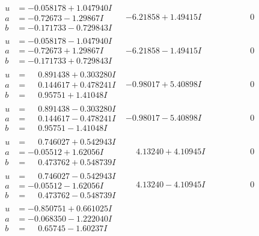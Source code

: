 \documentclass[1p]{elsarticle_modified}
\theoremstyle{definition}
\begin{document}
$$\begin{array}{c|c|c}
\begin{aligned}
u &= -0.058178 + 1.047940 I \\
a &= -0.72673 - 1.29867 I \\
b &= -0.171733 - 0.729843 I\end{aligned}
 & -6.21858 + 1.49415 I & \phantom{-0.000000 } 0 \\ \hline\begin{aligned}
u &= -0.058178 - 1.047940 I \\
a &= -0.72673 + 1.29867 I \\
b &= -0.171733 + 0.729843 I\end{aligned}
 & -6.21858 - 1.49415 I & \phantom{-0.000000 } 0 \\ \hline\begin{aligned}
u &= \phantom{-}0.891438 + 0.303280 I \\
a &= \phantom{-}0.144617 + 0.478241 I \\
b &= \phantom{-}0.95751 + 1.41048 I\end{aligned}
 & -0.98017 + 5.40898 I & \phantom{-0.000000 } 0 \\ \hline\begin{aligned}
u &= \phantom{-}0.891438 - 0.303280 I \\
a &= \phantom{-}0.144617 - 0.478241 I \\
b &= \phantom{-}0.95751 - 1.41048 I\end{aligned}
 & -0.98017 - 5.40898 I & \phantom{-0.000000 } 0 \\ \hline\begin{aligned}
u &= \phantom{-}0.746027 + 0.542943 I \\
a &= -0.05512 + 1.62056 I \\
b &= \phantom{-}0.473762 + 0.548739 I\end{aligned}
 & \phantom{-}4.13240 + 4.10945 I & \phantom{-0.000000 } 0 \\ \hline\begin{aligned}
u &= \phantom{-}0.746027 - 0.542943 I \\
a &= -0.05512 - 1.62056 I \\
b &= \phantom{-}0.473762 - 0.548739 I\end{aligned}
 & \phantom{-}4.13240 - 4.10945 I & \phantom{-0.000000 } 0 \\ \hline\begin{aligned}
u &= -0.850751 + 0.661025 I \\
a &= -0.068350 - 1.222040 I \\
b &= \phantom{-}0.65745 - 1.60237 I\end{aligned}

\end{array}$$
\end{document}
